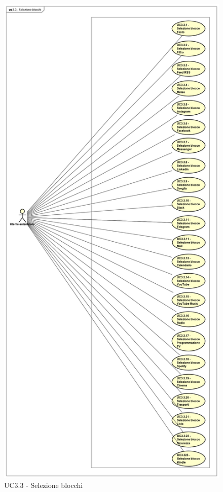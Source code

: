 \begin{figure}[htbp]
\centering
\includegraphics[scale=0.3]{immagini/UC3-3}
\caption{UC3.3 - Selezione blocchi\label{fig:UC3-3}}
\end{figure}

